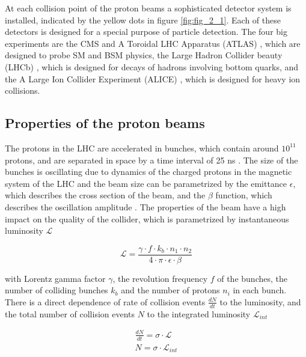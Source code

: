 At each collision point of the proton beams a sophisticated detector system is installed, indicated by the yellow dots in figure \ref{fig:fig_2_1}. Each of these detectors is designed for a special purpose of particle detection. The four big experiments are the \gls{CMS} and A Toroidal LHC Apparatus (\gls{ATLAS}) \cite{ATLAS}, which are designed to probe \gls{SM} and \gls{BSM} physics, the Large Hadron Collider beauty (\gls{LHCb}) \cite{LHCb}, which is designed for decays of hadrons involving bottom quarks, and the A Large Ion Collider Experiment (\gls{ALICE}) \cite{ALICE}, which is designed for heavy ion collisions.


\subsection{Properties of the proton beams}
\label{sec:section_2_1_1}

The protons in the \gls{LHC} are accelerated in bunches, which contain around $10^{11}$ protons, and are separated in space by a time interval of 25 ns \cite{LHCSTATS}. The size of the bunches is oscillating due to dynamics of the charged protons in the magnetic system of the \gls{LHC} \cite{LHC} and the beam size can be parametrized by the emittance $\epsilon$, which describes the cross section of the beam, and the $\beta$ function, which describes the oscillation amplitude \cite{BEAMPHY}. The properties of the beam have a high impact on the quality of the collider, which is parametrized by instantaneous luminosity $\mathcal{L}$ \cite{Luminosity}

\begin{equation}
	\label{eq:eq_2_1}
	\mathcal{L} = \frac{\gamma \cdot f \cdot k_{b} \cdot n_{1} \cdot n_{2}}{4 \cdot \pi \cdot \epsilon \cdot \beta}
\end{equation} 

with Lorentz gamma factor $\gamma$, the revolution frequency $f$ of the bunches, the number of colliding bunches $k_{b}$ and the number of protons $n_{i}$ in each bunch. There is a direct dependence of rate of collision events $\frac{dN}{dt}$ to the luminosity, and the total number of collision events $N$ to the integrated luminosity $\mathcal{L}_{int}$

\begin{equation}
	\label{eq:eq_2_2}
	\begin{split}
		\frac{dN}{dt} = \sigma \cdot \mathcal{L} \\
		N = \sigma \cdot \mathcal{L}_{int}
	\end{split}
\end{equation}	

